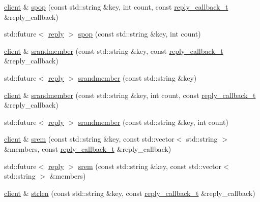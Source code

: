 \begin{DoxyCompactItemize}
\item 
\hyperlink{classcpp__redis_1_1client}{client} \& \hyperlink{classcpp__redis_1_1client_a75a34f373c405999036a1e7e476ff201}{spop} (const std\+::string \&key, int count, const \hyperlink{classcpp__redis_1_1client_a061a1140d36d2eaeda82b09a0bb3f9f2}{reply\+\_\+callback\+\_\+t} \&reply\+\_\+callback)
\item 
std\+::future$<$ \hyperlink{classcpp__redis_1_1reply}{reply} $>$ \hyperlink{classcpp__redis_1_1client_acde89afde549cbe7ead5453fd3635081}{spop} (const std\+::string \&key, int count)
\item 
\hyperlink{classcpp__redis_1_1client}{client} \& \hyperlink{classcpp__redis_1_1client_a69e771fb9562fca08cbf653f8ecb295b}{srandmember} (const std\+::string \&key, const \hyperlink{classcpp__redis_1_1client_a061a1140d36d2eaeda82b09a0bb3f9f2}{reply\+\_\+callback\+\_\+t} \&reply\+\_\+callback)
\item 
std\+::future$<$ \hyperlink{classcpp__redis_1_1reply}{reply} $>$ \hyperlink{classcpp__redis_1_1client_a2a110009cac1bb5063d468df91802395}{srandmember} (const std\+::string \&key)
\item 
\hyperlink{classcpp__redis_1_1client}{client} \& \hyperlink{classcpp__redis_1_1client_a59e0a8886b5f4fa177e93053b9965827}{srandmember} (const std\+::string \&key, int count, const \hyperlink{classcpp__redis_1_1client_a061a1140d36d2eaeda82b09a0bb3f9f2}{reply\+\_\+callback\+\_\+t} \&reply\+\_\+callback)
\item 
std\+::future$<$ \hyperlink{classcpp__redis_1_1reply}{reply} $>$ \hyperlink{classcpp__redis_1_1client_a23913f257f58864d865d70bfe462caa4}{srandmember} (const std\+::string \&key, int count)
\item 
\hyperlink{classcpp__redis_1_1client}{client} \& \hyperlink{classcpp__redis_1_1client_a020849a43f10f56941ef98716440d817}{srem} (const std\+::string \&key, const std\+::vector$<$ std\+::string $>$ \&members, const \hyperlink{classcpp__redis_1_1client_a061a1140d36d2eaeda82b09a0bb3f9f2}{reply\+\_\+callback\+\_\+t} \&reply\+\_\+callback)
\item 
std\+::future$<$ \hyperlink{classcpp__redis_1_1reply}{reply} $>$ \hyperlink{classcpp__redis_1_1client_a542bc98a1968e22dfce3cd7051680b6f}{srem} (const std\+::string \&key, const std\+::vector$<$ std\+::string $>$ \&members)
\item 
\hyperlink{classcpp__redis_1_1client}{client} \& \hyperlink{classcpp__redis_1_1client_ab7dab44434cee5e29e2bdf3c3be1df94}{strlen} (const std\+::string \&key, const \hyperlink{classcpp__redis_1_1client_a061a1140d36d2eaeda82b09a0bb3f9f2}{reply\+\_\+callback\+\_\+t} \&reply\+\_\+callback)

\end{DoxyCompactItemize}
